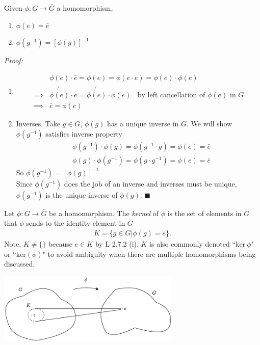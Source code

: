 \begin{lemma}
Given $\phi: G\rightarrow \bar{G}$ a homomorphism,
\begin{enumerate}[label=\roman*)]
    \item $\phi(e)=\bar{e}$
    \item $\phi(g^{-1})=[\phi(g)]^{-1}$
\end{enumerate}
\textit{Proof:}
\begin{enumerate}[label=\roman*)]
    \item \begin{align}
        &\phi(e)\cdot \bar{e}=\phi(e)=\phi(e\cdot e)=\phi(e)\cdot\phi(e) \nonumber \\
        \implies & \not {\phi(e)}\cdot \bar{e}=\not{\phi(e)}\cdot\phi(e) \ \ \ \ \text{by left cancellation of $\phi(e)$ in }\bar{G} \nonumber \\
        \implies &\bar{e}=\phi(e) \nonumber
    \end{align} 
    \item Inverses. Take $g\in G$, $\phi(g)$ has a unique inverse in $\bar{G}$. We will show $\phi(g^{-1})$ satisfies inverse property
    \begin{align}
        &\phi(g^{-1})\cdot \phi(g)= \phi(g^{-1}\cdot g)=\phi(e)=\bar{e} \nonumber \\
        &\phi(g)\cdot\phi(g^{-1})=\phi(g\cdot g^{-1})=\phi(e)=\bar{e} \nonumber
    \end{align}
    So $\phi(g^{-1})=[\phi(g)]^{-1}$\\
    Since $\phi(g^{-1})$ does the job of an inverse and inverses must be unique, $\phi(g^{-1})$ is the unique inverse of $\phi(g)$. $\blacksquare$ 
\end{enumerate}
\end{lemma}
\newpage
\begin{definition}[Kernel]
Let $\phi:G\rightarrow \bar{G}$ be a homomorphism. The \textit{kernel} of $\phi$ is the set of elements in $G$ that $\phi$ sends to the identity element in $\bar{G}$
\begin{align}
    K= \{g\in G | \phi(g)=\bar{e}\}. \nonumber
\end{align}
Note, $K\neq \{\}$ because $e\in K$ by L 2.7.2 (i). $K$ is also commonly denoted ``$\text{ker}\ \phi$" or ``$\text{ker}(\phi)$" to avoid ambiguity when there are multiple homomorphisms being discussed.\\
\begin{center}
    \includegraphics[width=0.65\textwidth]{Figures/kernel_hom.pdf}
\end{center}
\end{definition}

